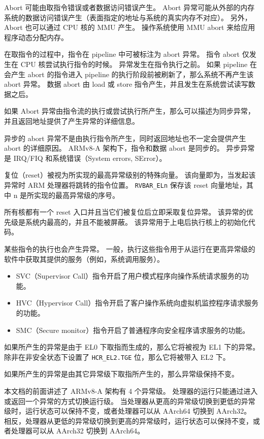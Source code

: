 
Abort 可能由取指令错误或者数据访问错误产生。
Abort 异常可能从外部的内存系统的数据访问错误产生（表面指定的地址与系统的真实内存不对应）。
另外，Abort 也可以通过 CPU 核的 MMU 产生。
操作系统使用 MMU abort 来给应用程序动态分配内存。

在取指令的过程中，指令在 pipeline 中可被标注为 abort 异常。
指令 abort 仅发生在 CPU 核尝试执行指令的时候。
异常发生在指令执行之前。
如果 pipeline 在会产生 abort 的指令进入 pipeline 的执行阶段前被刷新了，那么系统不再产生该 abort 异常。
数据 abort 由 load 或 store 指令产生，并且发生在系统尝试读写数据之后。

如果 Abort 异常由指令流的执行或尝试执行所产生，那么可以描述为同步异常，并且返回地址提供了产生异常的详细信息。

异步的 abort 异常不是由执行指令所产生，同时返回地址也不一定会提供产生 abort 的详细原因。
ARMv8-A 架构下，指令和数据 abort 是同步的。
异步异常是 IRQ/FIQ 和系统错误（System errors, SError）。


复位（reset）被视为所实现的最高异常级别的特殊向量。
该向量即为，当发起该异常时 ARM 处理器将跳转的指令位置。
\lstinline!RVBAR_ELn! 保存该 reset 向量地址，其中 n 是所实现的最高异常级的序号。

所有核都有一个 reset 入口并且当它们被复位后立即采取复位异常。
该异常的优先级是系统内最高的，并且不能被屏蔽。
该异常用于上电后执行核上的初始化代码。


某些指令的执行也会产生异常。
一般，执行这些指令用于从运行在更高异常级的软件中获取其提供的服务（例如，系统调用服务）。

\begin{itemize}
  \item SVC（Supervisor Call）指令开启了用户模式程序向操作系统请求服务的功能。
  \item HVC（Hypervisor Call）指令开启了客户操作系统向虚拟机监控程序请求服务的功能。
  \item SMC（Secure monitor）指令开启了普通程序向安全程序请求服务的功能。
\end{itemize}

如果所产生的异常是由于 EL0 下取指而生成的，那么它将被视为 EL1 下的异常。
除非在非安全状态下设置了 \lstinline!HCR_EL2.TGE! 位，那么它将被带入 EL2 下。

如果所产生的异常是由其它异常级下取指所产生的，那么异常级保持不变。

本文档的前面讲述了 ARMv8-A 架构有 4 个异常级。
处理器的运行只能通过进入或返回一个异常的方式切换运行级。
当处理器从更高的异常级切换到更低的异常级时，运行状态可以保持不变，或者处理器可以从 AArch64 切换到 AArch32。
相反，处理器从更低的异常级切换到更高的异常级时，运行状态可以保持不变，或者处理器可以从 AArch32 切换到 AArch64。

